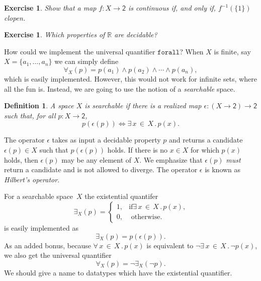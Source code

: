\documentclass[a4paper,10pt]{article}
\newtheorem{exercise}[theorem]{Exercise}
\newtheorem{definition}[theorem]{Definition}
\newcommand{\RR}{\mathbb{R}}
\newcommand{\set}[1]{\{#1\}}
\newcommand{\two}{\mathsf{2}}
\newcommand{\xall}[3]{\forall\, #1 \,{\in}\, #2\,.\,#3}
\newcommand{\xsome}[3]{\exists\, #1 \,{\in}\, #2\,.\,#3}
\begin{document}
\begin{exercise} Show that a map $f : X \to \two$ is continuous if, and only
if, $f^{-1}(\set{1})$ clopen.
\end{exercise}

\begin{exercise} Which properties of $\RR$ are decidable?
\end{exercise}
% 
How could we implement the universal quantifier $\mathtt{forall}$? When $X$ is
finite, say $X = \set{a_1, \ldots, a_n}$ we can simply define
% 
\begin{equation*} \forall_X(p) = p(a_1) \land p(a_2) \land \cdots \land
p(a_n),
\end{equation*}
% 
which is easily implemented.
% 
However, this would not work for infinite sets, where all the fun is. Instead,
we are going to use the notion of a \emph{searchable} space.

\begin{definition} A space $X$ is \emph{searchable} if there is a realized map
$\epsilon : (X \to \two) \to \two$ such that, for all $p : X \to \two$,
  \begin{equation*} p (\epsilon(p)) \iff \xsome{x}{X}{p(x)}.
  \end{equation*}
\end{definition}

The operator $\epsilon$ takes as input a decidable property $p$ and returns a
candidate $\epsilon(p) \in X$ such that $p(\epsilon(p))$ holds. If there is no
$x \in X$ for which $p(x)$ holds, then $\epsilon(p)$ may be any element of
$X$. We emphasize that $\epsilon(p)$ \emph{must} return a candidate and is not
allowed to diverge. The operator $\epsilon$ is known as \emph{Hilbert's
operator}.

For a searchable space~$X$ the existential quantifer
% 
\begin{equation*} \exists_X(p) = \begin{cases} 1, &\text{if
$\xsome{x}{X}{p(x)}$,}\\ 0, &\text{ otherwise.}
  \end{cases}
\end{equation*}
% 
is easily implemented as
\begin{equation*} \exists_X(p) = p (\epsilon(p)).
\end{equation*}
% 
As an added bonus, because $\xall{x}{X}{p(x)}$ is equivalent to
$\lnot\xsome{x}{X}{\lnot p(x)}$, we also get the universal quantifier
% 
\begin{equation*} \forall_X(p) = \lnot \exists_X(\lnot p).
\end{equation*}
% 
We should give a name to datatypes which have the existential quantifier.
\end{document}
